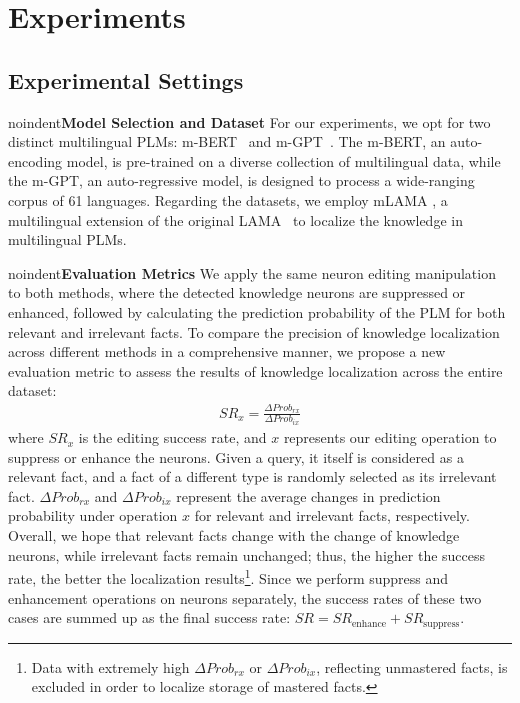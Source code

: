\documentclass[]{article}
\newcommand{\vpara}[1]{noindent\textbf{#1 }}%
\begin{document}
\section{Experiments}
\subsection{Experimental Settings}
\vpara{Model Selection and Dataset}
For our experiments, we opt for two distinct multilingual PLMs: m-BERT~\cite{mbert} and m-GPT~\cite{mgpt}. The m-BERT, an auto-encoding model, is pre-trained on a diverse collection of multilingual data, while the m-GPT, an auto-regressive model, is designed to process a wide-ranging corpus of 61 languages. Regarding the datasets, we employ mLAMA \cite{mlama}, a multilingual extension of the original LAMA~\cite{fill-in-the-blank,lama2} to localize the knowledge in multilingual PLMs.

\vpara{Evaluation Metrics}
We apply the same neuron editing manipulation to both methods, where the detected knowledge neurons are suppressed or enhanced, followed by calculating the prediction probability of the PLM for both relevant and irrelevant facts. To compare the precision of knowledge localization across different methods in a comprehensive manner, we propose a new evaluation metric to assess the results of knowledge localization across the entire dataset:
{\small\begin{align}
SR_x = \frac{{\Delta Prob_{rx}}}{{\Delta Prob_{ix}}}
\end{align}
}where \( SR_x \) is the editing success rate, and \( x \) represents our editing operation to suppress or enhance the neurons. Given a query, it itself is considered as a relevant fact, and a fact of a different type is randomly selected as its irrelevant fact. $\Delta Prob_{rx}$ and $\Delta Prob_{ix}$ represent the average changes in prediction probability under operation $x$ for relevant and irrelevant facts, respectively. Overall, we hope that relevant facts change with the change of knowledge neurons, while irrelevant facts remain unchanged; thus, the higher the success rate, the better the localization results\footnote{Data with extremely high $\Delta Prob_{rx}$ or \( \Delta Prob_{ix} \), reflecting unmastered facts, is excluded in order to localize storage of mastered facts.}. Since we perform suppress and enhancement operations on neurons separately, the success rates of these two cases are summed up as the final success rate: $SR = {SR_{\text{enhance}}}+{SR_{\text{suppress}}}$.
\end{document}

